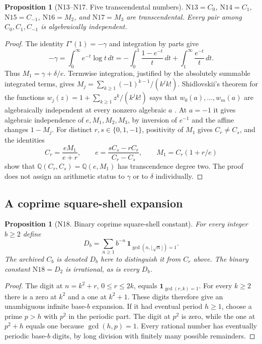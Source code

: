 \documentclass[11pt,a4paper]{article}
\newtheorem{proposition}[theorem]{Proposition}
\theoremstyle{definition}
\theoremstyle{remark}
\begin{document}
\par\hypertarget{cat-N13}{}\label{page:N13}\hypertarget{cat-N14}{}\label{page:N14}\hypertarget{cat-N15}{}\label{page:N15}\hypertarget{cat-N16}{}\label{page:N16}\hypertarget{cat-N17}{}\label{page:N17}
\begin{proposition}[N13--N17. Five transcendental numbers]
$\mathrm{N13}=C_0$, $\mathrm{N14}=C_1$, $\mathrm{N15}=C_{-1}$,
$\mathrm{N16}=M_2$, and $\mathrm{N17}=M_3$ are transcendental.
Every pair among $C_0,C_1,C_{-1}$ is algebraically independent.
\end{proposition}
\begin{proof}
The identity $\Gamma'(1)=-\gamma$ and integration by parts give
\[
 -\gamma=\int_0^\infty e^{-t}\log t\,dt
 =-\int_0^1\frac{1-e^{-t}}t\,dt+
  \int_1^\infty\frac{e^{-t}}t\,dt .
\]
Thus $M_1=\gamma+\delta/e$. Termwise integration, justified by the
absolutely summable integrated terms, gives
$M_j=\sum_{k\ge1}(-1)^{k-1}/(k^j k!)$.
Shidlovskii's theorem for the functions
$w_j(z)=1+\sum_{k\ge1}z^k/(k^j k!)$ says that
$w_0(a),\ldots,w_m(a)$ are algebraically independent at every
nonzero algebraic $a$ \cite[Ch.~7, \S1, Thm.~1]{nShid}.
At $a=-1$ it gives algebraic independence of
$e,M_1,M_2,M_3$, by inversion of $e^{-1}$ and the affine
changes $1-M_j$. For distinct $r,s\in\{0,1,-1\}$, positivity of
$M_1$ gives $C_r\ne C_s$, and the identities
\[
 C_r=\frac{eM_1}{e+r},\qquad
 e=\frac{sC_s-rC_r}{C_r-C_s},\qquad M_1=C_r(1+r/e)
\]
show that $\mathbb Q(C_r,C_s)=\mathbb Q(e,M_1)$ has transcendence
degree two. The proof does not assign an arithmetic status to $\gamma$
or to $\delta$ individually.
\end{proof}

\subsection{A coprime square-shell expansion}
\par\hypertarget{cat-N18}{}\label{page:N18}
\begin{proposition}[N18. Binary coprime square-shell constant]
For every integer $b\ge2$ define
\[
 D_b=\sum_{n\ge1}b^{-n}\,\mathbf 1_{\gcd(n,\lfloor\sqrt n\rfloor)=1}.
\]
The archived $C_b$ is denoted $D_b$ here to distinguish it from $C_r$
above. The binary constant $\mathrm{N18}=D_2$ is irrational, as is
every $D_b$.
\end{proposition}
\begin{proof}
The digit at $n=k^2+r$, $0\le r\le 2k$, equals
$\mathbf 1_{\gcd(r,k)=1}$. For every $k\ge2$ there is a zero at $k^2$
and a one at $k^2+1$. These digits therefore give an unambiguous
infinite base-$b$ expansion. If it had eventual period $h\ge1$, choose
a prime $p>h$ with $p^2$ in the periodic part. The digit at $p^2$
is zero, while the one at $p^2+h$ equals one because $\gcd(h,p)=1$.
Every rational number has eventually periodic base-$b$ digits, by long
division with finitely many possible remainders.
\end{proof}
\end{document}
